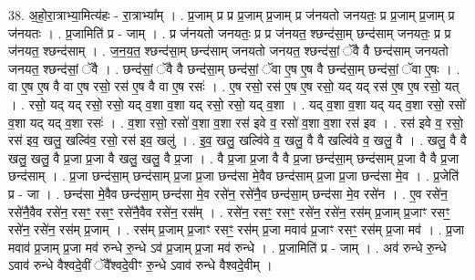 \documentclass[17pt]{extarticle}
\begin{document}
38. अ॒हो॒रा॒त्राभ्या॒मित्य॑हः - रा॒त्राभ्या᳚म् । . प्र॒जाम् प्र प्र प्र॒जाम् प्र॒जाम् प्र ज॑नयतो जनयतः॒ प्र प्र॒जाम् प्र॒जाम् प्र ज॑नयतः । . प्र॒जामिति॑ प्र - जाम् । . प्र ज॑नयतो जनयतः॒ प्र प्र ज॑नयत॒ श्छन्द॑सा॒म् छन्द॑साम् जनयतः॒ प्र प्र ज॑नयत॒ श्छन्द॑साम् । . ज॒न॒य॒त॒ श्छन्द॑सा॒म् छन्द॑साम् जनयतो जनयत॒ श्छन्द॑सां॒ ॅवै वै छन्द॑साम् जनयतो जनयत॒ श्छन्द॑सां॒ ॅवै । . छन्द॑सां॒ ॅवै वै छन्द॑सा॒म् छन्द॑सां॒ ॅवा ए॒ष ए॒ष वै छन्द॑सा॒म् छन्द॑सां॒ ॅवा ए॒षः । . वा ए॒ष ए॒ष वै वा ए॒ष रसो॒ रस॑ ए॒ष वै वा ए॒ष रसः॑ । . ए॒ष रसो॒ रस॑ ए॒ष ए॒ष रसो॒ यद् यद् रस॑ ए॒ष ए॒ष रसो॒ यत् । . रसो॒ यद् यद् रसो॒ रसो॒ यद् व॒शा व॒शा यद् रसो॒ रसो॒ यद् व॒शा । . यद् व॒शा व॒शा यद् यद् व॒शा रसो॒ रसो॑ व॒शा यद् यद् व॒शा रसः॑ । . व॒शा रसो॒ रसो॑ व॒शा व॒शा रस॑ इवे व॒ रसो॑ व॒शा व॒शा रस॑ इव । . रस॑ इवे व॒ रसो॒ रस॑ इव॒ खलु॒ खल्वि॑व॒ रसो॒ रस॑ इव॒ खलु॑ । . इ॒व॒ खलु॒ खल्वि॑वे व॒ खलु॒ वै वै खल्वि॑वे व॒ खलु॒ वै । . खलु॒ वै वै खलु॒ खलु॒ वै प्र॒जा प्र॒जा वै खलु॒ खलु॒ वै प्र॒जा । . वै प्र॒जा प्र॒जा वै वै प्र॒जा छन्द॑सा॒म् छन्द॑साम् प्र॒जा वै वै प्र॒जा छन्द॑साम् । . प्र॒जा छन्द॑सा॒म् छन्द॑साम् प्र॒जा प्र॒जा छन्द॑सा मे॒वैव छन्द॑साम् प्र॒जा प्र॒जा छन्द॑सा मे॒व । . प्र॒जेति॑ प्र - जा । . छन्द॑सा मे॒वैव छन्द॑सा॒म् छन्द॑सा मे॒व रसे॑न॒ रसे॑नै॒व छन्द॑सा॒म् छन्द॑सा मे॒व रसे॑न । . ए॒व रसे॑न॒ रसे॑नै॒वैव रसे॑न॒ रसꣳ॒॒ रसꣳ॒॒ रसे॑नै॒वैव रसे॑न॒ रस᳚म् । . रसे॑न॒ रसꣳ॒॒ रसꣳ॒॒ रसे॑न॒ रसे॑न॒ रस॑म् प्र॒जाम् प्र॒जाꣳ रसꣳ॒॒ रसे॑न॒ रसे॑न॒ रस॑म् प्र॒जाम् । . रस॑म् प्र॒जाम् प्र॒जाꣳ रसꣳ॒॒ रस॑म् प्र॒जा मवाव॑ प्र॒जाꣳ रसꣳ॒॒ रस॑म् प्र॒जा मव॑ । . प्र॒जा मवाव॑ प्र॒जाम् प्र॒जा मव॑ रुन्धे रु॒न्धे ऽव॑ प्र॒जाम् प्र॒जा मव॑ रुन्धे । . प्र॒जामिति॑ प्र - जाम् । . अव॑ रुन्धे रु॒न्धे ऽवाव॑ रुन्धे वैश्वदे॒वीं ॅवै᳚श्वदे॒वीꣳ रु॒न्धे ऽवाव॑ रुन्धे वैश्वदे॒वीम् । \newline
\pagebreak
{}
\end{document}
